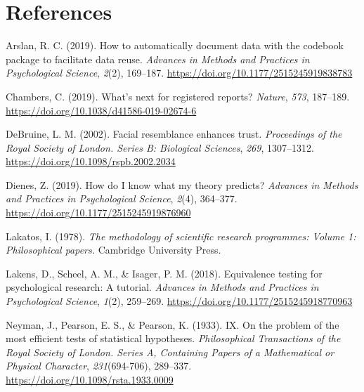 \documentclass[
  english,
  doc,floatsintext]{apa6}
\begin{document}
\newpage

\hypertarget{references}{%
\section{References}\label{references}}

\begingroup
\setlength{\parindent}{-0.5in}
\setlength{\leftskip}{0.5in}

\hypertarget{refs}{}
\leavevmode\hypertarget{ref-arslan2019}{}%
Arslan, R. C. (2019). How to automatically document data with the codebook package to facilitate data reuse. \emph{Advances in Methods and Practices in Psychological Science}, \emph{2}(2), 169--187. \url{https://doi.org/10.1177/2515245919838783}

\leavevmode\hypertarget{ref-chambers2019}{}%
Chambers, C. (2019). What's next for registered reports? \emph{Nature}, \emph{573}, 187--189. \url{https://doi.org/10.1038/d41586-019-02674-6}

\leavevmode\hypertarget{ref-debruine2002}{}%
DeBruine, L. M. (2002). Facial resemblance enhances trust. \emph{Proceedings of the Royal Society of London. Series B: Biological Sciences}, \emph{269}, 1307--1312. \url{https://doi.org/10.1098/rspb.2002.2034}

\leavevmode\hypertarget{ref-dienes2019}{}%
Dienes, Z. (2019). How do I know what my theory predicts? \emph{Advances in Methods and Practices in Psychological Science}, \emph{2}(4), 364--377. \url{https://doi.org/10.1177/2515245919876960}

\leavevmode\hypertarget{ref-lakatos1978}{}%
Lakatos, I. (1978). \emph{The methodology of scientific research programmes: Volume 1: Philosophical papers.} Cambridge University Press.

\leavevmode\hypertarget{ref-lakens2018}{}%
Lakens, D., Scheel, A. M., \& Isager, P. M. (2018). Equivalence testing for psychological research: A tutorial. \emph{Advances in Methods and Practices in Psychological Science}, \emph{1}(2), 259--269. \url{https://doi.org/10.1177/2515245918770963}

\leavevmode\hypertarget{ref-neyman1933}{}%
Neyman, J., Pearson, E. S., \& Pearson, K. (1933). IX. On the problem of the most efficient tests of statistical hypotheses. \emph{Philosophical Transactions of the Royal Society of London. Series A, Containing Papers of a Mathematical or Physical Character}, \emph{231}(694-706), 289--337. \url{https://doi.org/10.1098/rsta.1933.0009}

\endgroup
\end{document}
